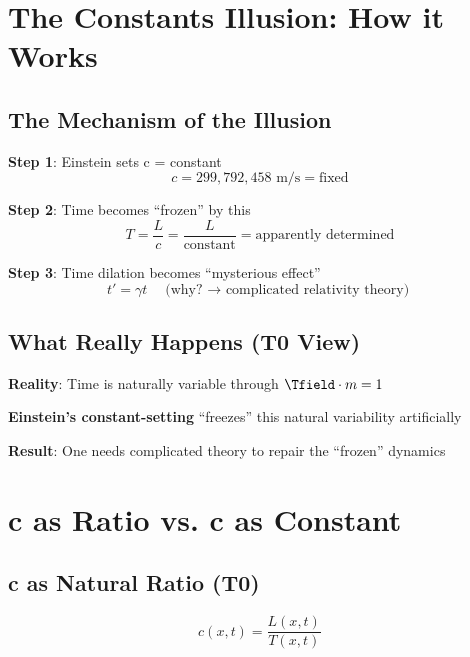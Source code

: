 	\section{The Constants Illusion: How it Works}
	
	\subsection{The Mechanism of the Illusion}
	
	\textbf{Step 1}: Einstein sets c = constant
	\begin{equation}
		c = 299,792,458 \text{ m/s} = \text{fixed}
	\end{equation}
	
	\textbf{Step 2}: Time becomes ``frozen'' by this
	\begin{equation}
		T = \frac{L}{c} = \frac{L}{\text{constant}} = \text{apparently determined}
	\end{equation}
	
	\textbf{Step 3}: Time dilation becomes ``mysterious effect''
	\begin{equation}
		t' = \gamma t \quad \text{(why? $\rightarrow$ complicated relativity theory)}
	\end{equation}
	
	\subsection{What Really Happens (T0 View)}
	
	\textbf{Reality}: Time is naturally variable through $\Tfield \cdot m = 1$
	
	\textbf{Einstein's constant-setting} ``freezes'' this natural variability artificially
	
	\textbf{Result}: One needs complicated theory to repair the ``frozen'' dynamics
	
	\section{c as Ratio vs. c as Constant}
	
	\subsection{c as Natural Ratio (T0)}
	
	\begin{equation}
		c(x,t) = \frac{L(x,t)}{T(x,t)}
	\end{equation}
	
